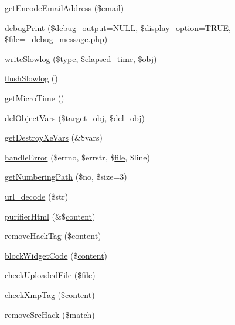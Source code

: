 \begin{DoxyCompactItemize}
\item 
\hyperlink{func_8inc_8php_a3ec2d6f22b5d041d959d1c56967b13ce}{get\+Encode\+Email\+Address} (\$email)
\item 
\hyperlink{func_8inc_8php_a383a432cf2963c8be1f9c03590adf423}{debug\+Print} (\$debug\+\_\+output=N\+U\+LL, \$display\+\_\+option=T\+R\+UE, \$\hyperlink{classfile}{file}=\textquotesingle{}\+\_\+debug\+\_\+message.\+php\textquotesingle{})
\item 
\hyperlink{func_8inc_8php_ad04b6facc446291dbbb292553250a4a6}{write\+Slowlog} (\$type, \$elapsed\+\_\+time, \$obj)
\item 
\hyperlink{func_8inc_8php_aafb6a81a912bf5b857fdc1e8528bc853}{flush\+Slowlog} ()
\item 
\hyperlink{func_8inc_8php_a83ff2cccfdfaf38ba29c8c6d04586deb}{get\+Micro\+Time} ()
\item 
\hyperlink{func_8inc_8php_a9ee9f577ae4c2fe0ee8565ba3dd64adc}{del\+Object\+Vars} (\$target\+\_\+obj, \$del\+\_\+obj)
\item 
\hyperlink{func_8inc_8php_a563d33afe37e2b440a2f4500f58eeb64}{get\+Destroy\+Xe\+Vars} (\&\$vars)
\item 
\hyperlink{func_8inc_8php_a4d13a097a6f6c56eadda408e9af13497}{handle\+Error} (\$errno, \$errstr, \$\hyperlink{classfile}{file}, \$line)
\item 
\hyperlink{func_8inc_8php_ae1a0ad24dbf34de227ffd2eb0d1f8da3}{get\+Numbering\+Path} (\$no, \$size=3)
\item 
\hyperlink{func_8inc_8php_a02ee51ef0a2362e75837547700dc4f84}{url\+\_\+decode} (\$str)
\item 
\hyperlink{func_8inc_8php_af8504615daee340af724f099cc69662f}{purifier\+Html} (\&\$\hyperlink{classcontent}{content})
\item 
\hyperlink{func_8inc_8php_abde22c0ee89dfd569abd1e338b3b2cf5}{remove\+Hack\+Tag} (\$\hyperlink{classcontent}{content})
\item 
\hyperlink{func_8inc_8php_a3e4480709a0bb53f6478ae6521cda6f3}{block\+Widget\+Code} (\$\hyperlink{classcontent}{content})
\item 
\hyperlink{func_8inc_8php_a771c122bb7a5b7038f7f751f5e2129b9}{check\+Uploaded\+File} (\$\hyperlink{classfile}{file})
\item 
\hyperlink{func_8inc_8php_a2095695afd9791bcab30bc8b53a68046}{check\+Xmp\+Tag} (\$\hyperlink{classcontent}{content})
\item 
\hyperlink{func_8inc_8php_aac01d80c0a850100a25ae023b78e6b7c}{remove\+Src\+Hack} (\$match)
\item 

\end{DoxyCompactItemize}
